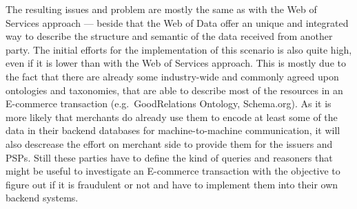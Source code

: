 The resulting issues and problem are mostly the same as with the Web of Services approach --- beside that the Web of Data offer an unique and integrated way to describe the structure and semantic of the data received from another party. The initial efforts for the implementation of this scenario is also quite high, even if it is lower than with the Web of Services approach. This is mostly due to the fact that there are already some industry-wide and commonly agreed upon ontologies and taxonomies, that are able to describe most of the resources in an E-commerce transaction (e.g.\ GoodRelations Ontology, Schema.org). As it is more likely that merchants do already use them to encode at least some of the data in their backend databases for machine-to-machine communication, it will also descrease the effort on merchant side to provide them for the issuers and \gls{PSP}s. Still these parties have to define the kind of queries and reasoners that might be useful to investigate an E-commerce transaction with the objective to figure out if it is fraudulent or not and have to implement them into their own backend systems.


